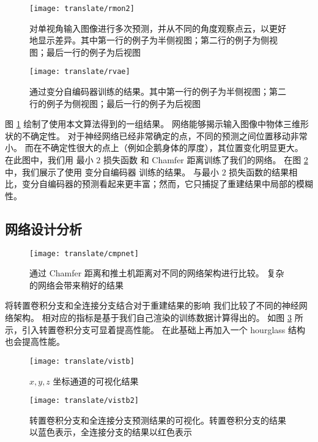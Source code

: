 \begin{figure}[h]
	\centering
	\texttt{[image: translate/rmon2]}
	\caption[]{对单视角输入图像进行多次预测，并从不同的角度观察点云，以更好地显示差异。其中第一行的例子为半侧视图；第二行的例子为侧视图；最后一行的例子为后视图}
	\label{fig:translate:rmon2}
\end{figure}

\begin{figure}[h]
	\centering
	\texttt{[image: translate/rvae]}
	\caption[]{通过变分自编码器训练的结果。其中第一行的例子为半侧视图；第二行的例子为侧视图；最后一行的例子为后视图}
	\label{fig:translate:rvae}
\end{figure}

图 \ref{fig:translate:rmon2} 绘制了使用本文算法得到的一组结果。
网络能够揭示输入图像中物体三维形状的不确定性。 对于神经网络已经非常确定的点，不同的预测之间位置移动非常小。
而在不确定性很大的点上（例如企鹅身体的厚度），其位置变化明显更大。 在此图中，我们用 最小 $2$ 损失函数 和 Chamfer 距离训练了我们的网络。
在图 \ref{fig:translate:rvae} 中，我们展示了使用 变分自编码器 训练的结果。 与最小 $2$ 损失函数的结果相比，变分自编码器的预测看起来更丰富；然而，它只捕捉了重建结果中局部的模糊性。


\subsection{网络设计分析 \label{section:translate:net_analyse}}

\begin{figure}[h]
	\centering
	\texttt{[image: translate/cmpnet]}
	\caption[]{通过 Chamfer 距离和推土机距离对不同的网络架构进行比较。 复杂的网络会带来稍好的结果}
	\label{fig:translate:cmpnet}
\end{figure}

{\heiti 将转置卷积分支和全连接分支结合对于重建结果的影响}
我们比较了不同的神经网络架构。
相对应的指标是基于我们自己渲染的训练数据计算得出的。
如图 \ref{fig:translate:cmpnet} 所示，引入转置卷积分支可显着提高性能。
在此基础上再加入一个 hourglass 结构也会提高性能。


\begin{figure}[h]
	\centering
	\texttt{[image: translate/vistb]}
	\caption[]{ $x, y, z$ 坐标通道的可视化结果}
	\label{fig:translate:vistb}
\end{figure}


\begin{figure}[h]
	\centering
	\texttt{[image: translate/vistb2]}
	\caption[]{ 转置卷积分支和全连接分支预测结果的可视化。转置卷积分支的结果以蓝色表示，全连接分支的结果以红色表示}
	\label{fig:translate:vistb2}
\end{figure}

